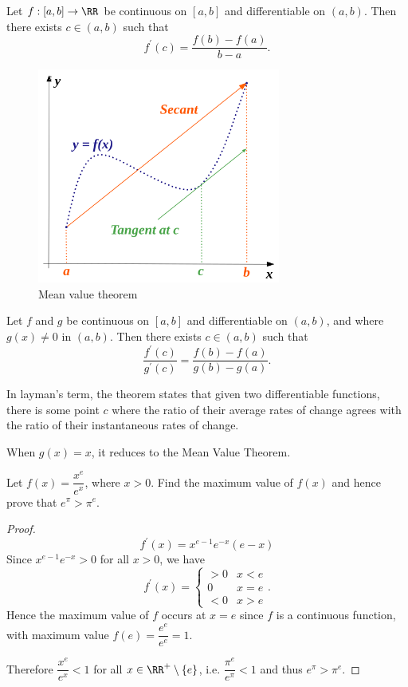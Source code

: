 \begin{theorem}
Let $f:[a,b]\to\RR$ be continuous on $[a,b]$ and differentiable on $(a,b)$. Then there exists $c\in(a,b)$ such that 
\[ f^\prime(c)=\frac{f(b)-f(a)}{b-a}. \]
\end{theorem}

\begin{figure}[H]
    \centering
    \includegraphics[width=8cm]{images/mean_value_thrm.png}
    \caption{Mean value theorem}
\end{figure}

\begin{theorem}
Let $f$ and $g$ be continuous on $[a,b]$ and differentiable on $(a,b)$, and where $g(x)\neq0$ in $(a,b)$. Then there exists $c\in(a,b)$ such that
\[ \frac{f^\prime(c)}{g^\prime(c)}=\frac{f(b)-f(a)}{g(b)-g(a)}. \]
\end{theorem}

In layman's term, the theorem states that given two differentiable functions, there is some point $c$ where the ratio of their average rates of change agrees with the ratio of their instantaneous rates of change.

\begin{remark}
When $g(x)=x$, it reduces to the Mean Value Theorem.
\end{remark}

\begin{exercise}
Let $f(x)=\dfrac{x^e}{e^x}$, where $x>0$. Find the maximum value of $f(x)$ and hence prove that $e^\pi>\pi^e$.
\end{exercise}

\begin{proof}
\[ f^\prime(x)=x^{e-1}e^{-x}(e-x) \]
Since $x^{e-1}e^{-x}>0$ for all $x>0$, we have
\[ f^\prime(x)=\begin{cases}
>0 & x<e\\
0 & x=e\\
<0 & x>e
\end{cases}. \]
Hence the maximum value of $f$ occurs at $x=e$ since $f$ is a continuous function, with maximum value $f(e)=\dfrac{e^e}{e^e}=1$.

Therefore $\dfrac{x^e}{e^x}<1$ for all $x\in\RR^+\setminus\{e\}$, i.e. $\dfrac{\pi^e}{e^\pi}<1$ and thus $e^\pi>\pi^e$.
\end{proof}

